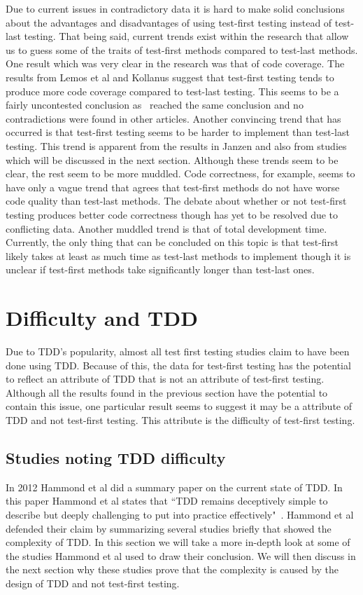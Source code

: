 \documentclass{sig-alternate}
\begin{document}
Due to current issues in contradictory data it is hard to make solid conclusions about the advantages and disadvantages of using test-first testing instead of test-last testing.  That being said, current trends exist within the research that allow us to guess some of the traits of test-first methods compared to test-last methods.  One result which was very clear in the research was that of code coverage.  The results from Lemos et al and Kollanus suggest that test-first testing tends to produce more code coverage compared to test-last testing. This seems to be a fairly uncontested conclusion as~\cite{Kettunen:2010, Hammond:2012} reached the same conclusion and no contradictions were found in other articles.  Another convincing trend that has occurred is that test-first testing seems to be harder to implement than test-last testing.  This trend is apparent from the results in Janzen and also from studies~\cite{Aniche:2010, George:2003} which will be discussed in the next section.     Although these trends seem to be clear, the rest seem to be more muddled.  Code correctness, for example, seems to have only a vague trend that agrees that test-first methods do not have worse code quality than test-last methods.  The debate about whether or not test-first testing produces better code correctness though has yet to be resolved due to conflicting data.  Another muddled trend is that of total development time.  Currently, the only thing that can be concluded on this topic is that test-first likely takes at least as much time as test-last methods to implement though it is unclear if test-first methods take significantly longer than test-last ones.

\section{Difficulty and TDD}
Due to TDD's popularity, almost all test first testing studies claim to have been done using TDD.  Because of this, the data for test-first testing has the potential to reflect an attribute of TDD that is not an attribute of test-first testing.  Although all the results found in the previous section have the potential to contain this issue, one particular result seems to suggest it may be a attribute of TDD and not test-first testing.  This attribute is the difficulty of test-first testing.  

\subsection{Studies noting TDD difficulty}
In 2012 Hammond et al did a summary paper on the current state of TDD.  In this paper Hammond et al states that ``TDD remains deceptively simple to describe but deeply challenging to put into practice effectively"~\cite{Hammond:2012}.  Hammond et al defended their claim by summarizing several studies briefly that showed  the complexity of TDD.  In this section we will take a more in-depth look at some of the studies Hammond et al used to draw their conclusion.  We will then discuss in the next section why these studies prove that the complexity is caused by the design of TDD and not test-first testing.
\end{document}
